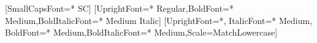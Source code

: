\ifXeTeX
    \usepackage[no-math]{fontspec}


    \setmainfont{Alegreya}[SmallCapsFont={* SC}]
    \setsansfont{Avenir Next}[UprightFont={* Regular},BoldFont={* Medium},BoldItalicFont={* Medium Italic}]
    \setmonofont{Fira Code}[UprightFont={*}, ItalicFont={* Medium}, BoldFont={* Medium},BoldItalicFont={* Medium},Scale=MatchLowercase]



\else
    \usepackage{fourier}
\fi

